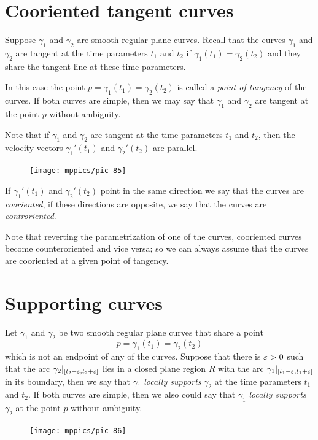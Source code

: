 \section{Cooriented tangent curves}

Suppose $\gamma_1$ and $\gamma_2$ are smooth regular plane curves.
Recall that the curves $\gamma_1$ and $\gamma_2$ are tangent at the  time parameters $t_1$ and $t_2$
if $\gamma_1(t_1)=\gamma_2(t_2)$
and they share the tangent line at these time parameters.

In this case the point $p=\gamma_1(t_1)=\gamma_2(t_2)$ is called a \emph{point of tangency} of the curves.
If both curves are simple, then we may say that $\gamma_1$ and $\gamma_2$ are tangent at the point $p$ 
without ambiguity.

Note that if $\gamma_1$ and $\gamma_2$ are tangent at the time parameters $t_1$ and $t_2$, 
then the velocity vectors $\gamma_1'(t_1)$ and $\gamma_2'(t_2)$ are parallel.
\begin{figure}[h!]
\vskip-0mm
\centering
\texttt{[image: mppics/pic-85]}
\vskip0mm
\end{figure}
If $\gamma_1'(t_1)$ and $\gamma_2'(t_2)$ point in the same direction we say that the curves are \emph{cooriented},
if these directions are opposite, we say that the curves are \emph{controriented}.


Note that reverting the parametrization of one of the curves, cooriented curves become counteroriented and vice versa; so we can always assume that the curves are cooriented at a given point of tangency.

\section{Supporting curves}

Let $\gamma_1$ and $\gamma_2$ be two smooth regular plane curves that share a point \[p=\gamma_1(t_1)=\gamma_2(t_2)\] which is not an endpoint of any of the curves.
Suppose that there is $\varepsilon>0$ such that the arc $\gamma_2|_{[t_2-\varepsilon, t_2+\varepsilon]}$ lies in a closed plane region $R$ with the arc $\gamma_1|_{[t_1-\varepsilon, t_1+\varepsilon]}$ in its boundary,
then we say that $\gamma_1$ \emph{locally supports} $\gamma_2$ at the time parameters $t_1$ and $t_2$.
If both curves are simple, then we also could say that $\gamma_1$ \emph{locally supports} $\gamma_2$ at the point $p$ without ambiguity.

\begin{figure}
\vskip-3mm
\centering
\texttt{[image: mppics/pic-86]}
\vskip0mm
\end{figure}

